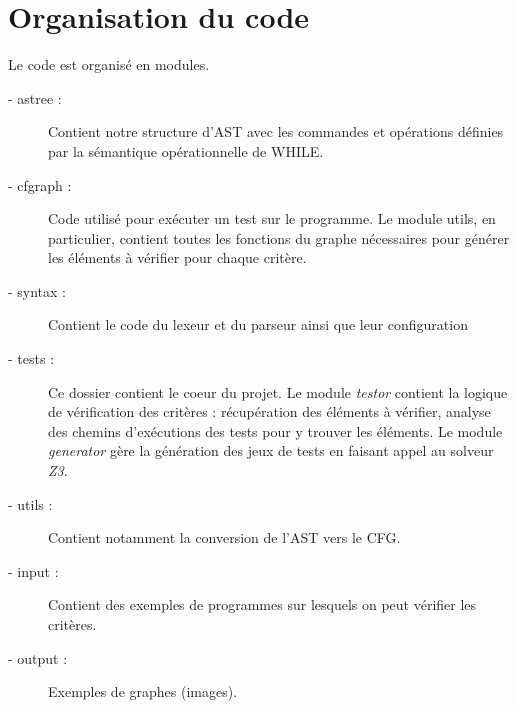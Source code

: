 
\section{Organisation du code}

Le code est organisé en modules.

\begin{description}
\item[- astree :] Contient notre structure d'AST avec les commandes et opérations définies par la sémantique opérationnelle de WHILE.
\item[- cfgraph :] Code utilisé pour exécuter un test sur le programme. Le module utils, en particulier, contient toutes les fonctions du graphe nécessaires pour générer les éléments à vérifier pour chaque critère.
\item[- syntax :] Contient le code du lexeur et du parseur ainsi que leur configuration
\item[- tests :] Ce dossier contient le coeur du projet. Le module \textit{testor} contient la logique de vérification des critères : récupération des éléments à vérifier, analyse des chemins d'exécutions des tests pour y trouver les éléments. Le module \textit{generator} gère la génération des jeux de tests en faisant appel au solveur \textit{Z3}.
\item[- utils :] Contient notamment la conversion de l'AST vers le CFG.
\item[- input :] Contient des exemples de programmes sur lesquels on peut vérifier les critères.
\item[- output :] Exemples de graphes (images).
\end{description}

